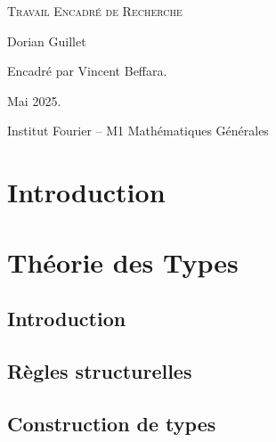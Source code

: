 \documentclass[a4paper, 11pt, twoside]{article}
\title{\Title}
\author{\Author}
\date{\today}
\begin{document}
  \begin{titlepage}
    \thispagestyle{empty}
    \begin{center}
      \vspace*{1cm}

      \large
      \textsc{Travail Encadré de Recherche}
      \vspace{1.5cm}

      \huge\textbf{\Title}
      \vspace{2cm}

      \large
      Dorian Guillet
      \vspace{1cm}

      Encadré par Vincent Beffara.

      \vfill
      Mai 2025.
      \vspace{1cm}

      Institut Fourier -- M1 Mathématiques Générales
    \end{center}
  \end{titlepage}

  \newpage
  \tableofcontents
  \thispagestyle{empty}

  \newpage
  \setcounter{page}{1}

  \thispagestyle{plain}
  \section*{Introduction}
    

  \newpage
  \section{Théorie des Types}
    \subsection{Introduction}
      

    \subsection{Règles structurelles}
      

    \subsection{Construction de types}
      
\end{document}

